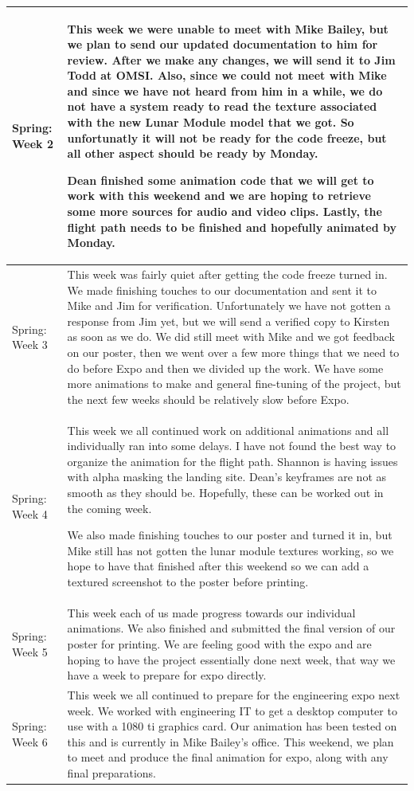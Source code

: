 \documentclass[onecolumn, draftclsnofoot,10pt, compsoc]{IEEEtran}
\begin{document}
\begin{longtable} {|p{1.5cm}|p{13.5cm}|}
Spring: Week 2 & This week we were unable to meet with Mike Bailey, but we plan to send our updated documentation to him for review. After we make any changes, we will send it to Jim Todd at OMSI. Also, since we could not meet with Mike and since we have not heard from him in a while, we do not have a system ready to read the texture associated with the new Lunar Module model that we got. So unfortunatly it will not be ready for the code freeze, but all other aspect should be ready by Monday. 

Dean finished some animation code that we will get to work with this weekend and we are hoping to retrieve some more sources for audio and video clips. Lastly, the flight path needs to be finished and hopefully animated by Monday.
\\ \hline

Spring: Week 3 & 
This week was fairly quiet after getting the code freeze turned in. We made finishing touches to our documentation and sent it to Mike and Jim for verification. Unfortunately we have not gotten a response from Jim yet, but we will send a verified copy to Kirsten as soon as we do. We did still meet with Mike and we got feedback on our poster, then we went over a few more things that we need to do before Expo and then we divided up the work. We have some more animations to make and general fine-tuning of the project, but the next few weeks should be relatively slow before Expo. 
\\ \hline

Spring: Week 4 & 
This week we all continued work on additional animations and all individually ran into some delays. I have not found the best way to organize the animation for the flight path. Shannon is having issues with alpha masking the landing site. Dean's keyframes are not as smooth as they should be. Hopefully, these can be worked out in the coming week. 

We also made finishing touches to our poster and turned it in, but Mike still has not gotten the lunar module textures working, so we hope to have that finished after this weekend so we can add a textured screenshot to the poster before printing. 
\\ \hline

Spring: Week 5 & 
This week each of us made progress towards our individual animations. We also finished and submitted the final version of our poster for printing. We are feeling good with the expo and are hoping to have the project essentially done next week, that way we have a week to prepare for expo directly. 
\\ \hline

Spring: Week 6 & This week we all continued to prepare for the engineering expo next week. We worked with engineering IT to get a desktop computer to use with a 1080 ti graphics card. Our animation has been tested on this and is currently in Mike Bailey's office. This weekend, we plan to meet and produce the final animation for expo, along with any final preparations. 
\\ \hline

\end{longtable}
\end{document}
